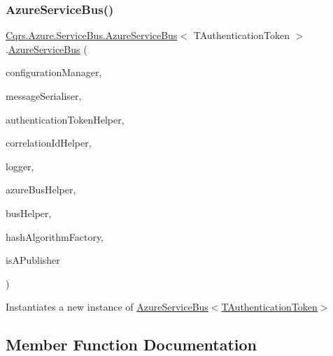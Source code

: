 \subsubsection{\texorpdfstring{Azure\+Service\+Bus()}{AzureServiceBus()}}
{\footnotesize\ttfamily \hyperlink{classCqrs_1_1Azure_1_1ServiceBus_1_1AzureServiceBus}{Cqrs.\+Azure.\+Service\+Bus.\+Azure\+Service\+Bus}$<$ T\+Authentication\+Token $>$.\hyperlink{classCqrs_1_1Azure_1_1ServiceBus_1_1AzureServiceBus}{Azure\+Service\+Bus} (\begin{DoxyParamCaption}\item[{\hyperlink{interfaceCqrs_1_1Configuration_1_1IConfigurationManager}{I\+Configuration\+Manager}}]{configuration\+Manager,  }\item[{\hyperlink{interfaceCqrs_1_1Azure_1_1ServiceBus_1_1IMessageSerialiser}{I\+Message\+Serialiser}$<$ T\+Authentication\+Token $>$}]{message\+Serialiser,  }\item[{\hyperlink{interfaceCqrs_1_1Authentication_1_1IAuthenticationTokenHelper}{I\+Authentication\+Token\+Helper}$<$ T\+Authentication\+Token $>$}]{authentication\+Token\+Helper,  }\item[{I\+Correlation\+Id\+Helper}]{correlation\+Id\+Helper,  }\item[{I\+Logger}]{logger,  }\item[{\hyperlink{interfaceCqrs_1_1Azure_1_1ServiceBus_1_1IAzureBusHelper}{I\+Azure\+Bus\+Helper}$<$ T\+Authentication\+Token $>$}]{azure\+Bus\+Helper,  }\item[{\hyperlink{interfaceCqrs_1_1Bus_1_1IBusHelper}{I\+Bus\+Helper}}]{bus\+Helper,  }\item[{\hyperlink{interfaceCqrs_1_1Bus_1_1IHashAlgorithmFactory}{I\+Hash\+Algorithm\+Factory}}]{hash\+Algorithm\+Factory,  }\item[{bool}]{is\+A\+Publisher }\end{DoxyParamCaption})\hspace{0.3cm}{\ttfamily [protected]}}



Instantiates a new instance of \hyperlink{classCqrs_1_1Azure_1_1ServiceBus_1_1AzureServiceBus_a09e34bafdb96fb8136efa428df9f80b2_a09e34bafdb96fb8136efa428df9f80b2}{Azure\+Service\+Bus$<$\+T\+Authentication\+Token$>$} 



\subsection{Member Function Documentation}
\mbox{\label{classCqrs_1_1Azure_1_1ServiceBus_1_1AzureServiceBus_a6ea94560e02fce0d920c467062f5fc98_a6ea94560e02fce0d920c467062f5fc98}} 
